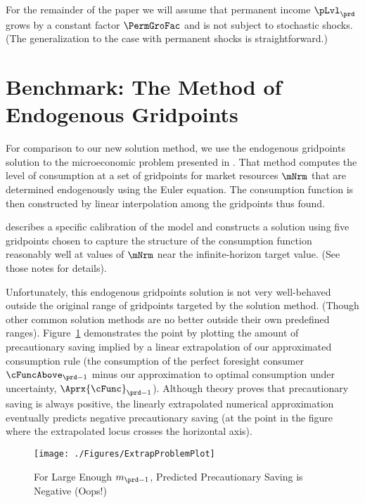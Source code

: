 \documentclass[titlepage, headings=optiontotocandhead]{econark}
\begin{document}


For the remainder of the paper we will assume that permanent income $\pLvl_{\prd}$ grows by a constant factor $\PermGroFac$ and is not subject to stochastic shocks.
(The generalization to the case with permanent shocks is straightforward.)

\hypertarget{benchmark}{}
\section{Benchmark: The Method of Endogenous Gridpoints}

For comparison to our new solution method, we use the endogenous gridpoints solution to the microeconomic problem presented in \cite{carrollEGM}.
That method computes the level of consumption at a set of gridpoints for market resources $\mNrm$ that are determined endogenously using the Euler equation.
The consumption function is then constructed by linear interpolation among the gridpoints thus found.

\cite{SolvingMicroDSOPs} describes a specific calibration of the model and constructs a solution using five gridpoints chosen to capture the structure of the consumption function reasonably well at values of $\mNrm$ near the infinite-horizon target value.
(See those notes for details).


  Unfortunately, this endogenous gridpoints solution is not very
  well-behaved outside the original range of gridpoints targeted by
  the solution method.  (Though other common solution methods are no
  better outside their own predefined ranges).
  Figure~\ref{fig:ExtrapProblem} demonstrates the point by plotting
  the amount of precautionary saving implied by a linear extrapolation
  of our approximated consumption rule (the consumption of the perfect
  foresight consumer $\cFuncAbove_{\prd-1}$ minus our approximation to
  optimal consumption under uncertainty, $\Aprx{\cFunc}_{\prd-1}$).
  Although theory proves that precautionary saving is always positive,
  the linearly extrapolated numerical approximation eventually
  predicts negative precautionary saving (at the point in the figure
  where the extrapolated locus crosses the horizontal axis).

  \hypertarget{ExtrapProblemPlot}{}
  \begin{figure}
    \texttt{[image: ./Figures/ExtrapProblemPlot]}
    \caption{For Large Enough $m_{\prd-1}$, Predicted Precautionary Saving is Negative (Oops!)}
    \label{fig:ExtrapProblem}
  \end{figure}
\end{document}
